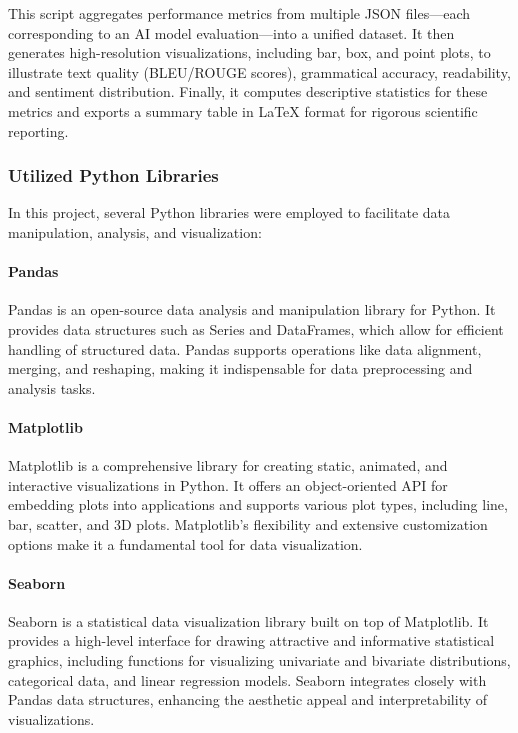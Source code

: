 This script aggregates performance metrics from multiple JSON files—each corresponding to an AI model evaluation—into a unified dataset. 
It then generates high-resolution visualizations, including bar, box, and point plots, to illustrate text quality (BLEU/ROUGE scores), 
grammatical accuracy, readability, and sentiment distribution. Finally, 
it computes descriptive statistics for these metrics and exports a summary table in LaTeX format for rigorous scientific reporting.

\subsubsection{Utilized Python Libraries}

In this project, several Python libraries were employed to facilitate data manipulation, analysis, and visualization:

\paragraph{Pandas}

Pandas is an open-source data analysis and manipulation library for Python. It provides data structures such as Series and DataFrames, which allow for efficient handling of structured data. Pandas supports operations like data alignment, merging, and reshaping, making it indispensable for data preprocessing and analysis tasks.

\cite{pandas}

\paragraph{Matplotlib}

Matplotlib is a comprehensive library for creating static, animated, and interactive visualizations in Python. It offers an object-oriented API for embedding plots into applications and supports various plot types, including line, bar, scatter, and 3D plots. Matplotlib's flexibility and extensive customization options make it a fundamental tool for data visualization.

\cite{matplotlib}

\paragraph{Seaborn}

Seaborn is a statistical data visualization library built on top of Matplotlib. It provides a high-level interface for drawing attractive and informative statistical graphics, including functions for visualizing univariate and bivariate distributions, categorical data, and linear regression models. Seaborn integrates closely with Pandas data structures, enhancing the aesthetic appeal and interpretability of visualizations.


